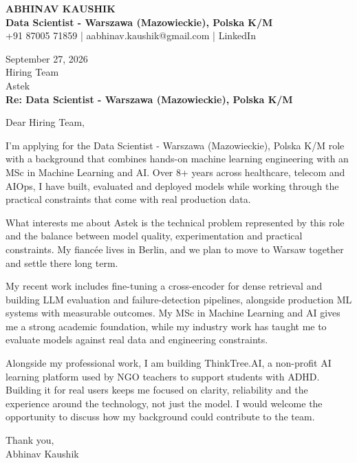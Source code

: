 \documentclass[10pt,a4paper]{article}
\begin{document}
\begin{center}
{\Large\bfseries ABHINAV KAUSHIK}\\[2pt]
{\bfseries Data Scientist - Warszawa (Mazowieckie), Polska K/M}\\[2pt]
+91 87005 71859 \quad | \quad aabhinav.kaushik@gmail.com \quad | \quad LinkedIn
\end{center}
\vspace{8pt}
September 27, 2026\\[6pt]
Hiring Team\\
Astek\\[4pt]
\textbf{Re: Data Scientist - Warszawa (Mazowieckie), Polska K/M}

Dear Hiring Team,

I’m applying for the Data Scientist - Warszawa (Mazowieckie), Polska K/M role with a background that combines hands-on machine learning engineering with an MSc in Machine Learning and AI. Over 8+ years across healthcare, telecom and AIOps, I have built, evaluated and deployed models while working through the practical constraints that come with real production data.

What interests me about Astek is the technical problem represented by this role and the balance between model quality, experimentation and practical constraints. My fiancée lives in Berlin, and we plan to move to Warsaw together and settle there long term.

My recent work includes fine-tuning a cross-encoder for dense retrieval and building LLM evaluation and failure-detection pipelines, alongside production ML systems with measurable outcomes. My MSc in Machine Learning and AI gives me a strong academic foundation, while my industry work has taught me to evaluate models against real data and engineering constraints.

Alongside my professional work, I am building ThinkTree.AI, a non-profit AI learning platform used by NGO teachers to support students with ADHD. Building it for real users keeps me focused on clarity, reliability and the experience around the technology, not just the model. I would welcome the opportunity to discuss how my background could contribute to the team.

Thank you,\\
Abhinav Kaushik
\end{document}
